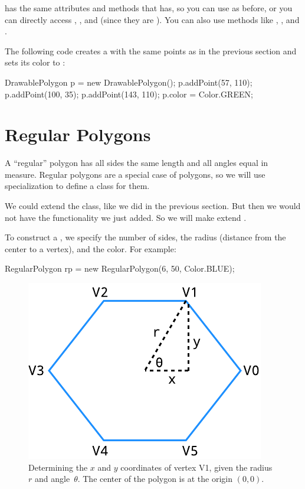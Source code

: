  has the same attributes and methods that  has, so you can use  as before, or you can directly access , , and  (since they are ).
You can also use methods like , , and .

The following code creates a  with the same points as in the previous section and sets its color to :

\begin{code}
DrawablePolygon p = new DrawablePolygon();
p.addPoint(57, 110);
p.addPoint(100, 35);
p.addPoint(143, 110);
p.color = Color.GREEN;
\end{code}


\section{Regular Polygons}

A ``regular'' polygon has all sides the same length and all angles equal in measure.
Regular polygons are a special case of polygons, so we will use specialization to define a class for them.

We could extend the  class, like we did in the previous section.
But then we would not have the  functionality we just added.
So we will make  extend .

To construct a , we specify the number of sides, the radius (distance from the center to a vertex), and the color.
For example:

\begin{code}
RegularPolygon rp = new RegularPolygon(6, 50, Color.BLUE);
\end{code}

\begin{figure}[!ht]
\begin{center}
\includegraphics{figs/hexagon.pdf}
\caption{Determining the $x$ and $y$ coordinates of vertex V1, given the radius~$r$ and angle~$\theta$.
The center of the polygon is at the origin $(0, 0)$.}
\label{fig:hexagon}
\end{center}
\end{figure}

